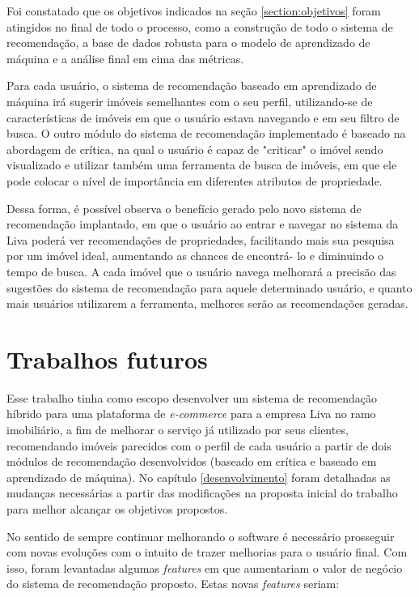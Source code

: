 Foi constatado que os objetivos indicados na seção \ref{section:objetivos} foram atingidos no final de todo o processo, como a construção de todo o sistema de recomendação, a base de dados robusta para o modelo de aprendizado de máquina e a análise final em cima das métricas.

Para cada usuário, o sistema de recomendação baseado em aprendizado de máquina irá sugerir imóveis semelhantes com o seu perfil, utilizando-se de características de imóveis em que o usuário estava navegando e em seu filtro de busca. O outro módulo do sistema de recomendação implementado é baseado na abordagem de crítica, na qual o usuário é capaz de "criticar" o imóvel sendo visualizado e utilizar também uma ferramenta de busca de imóveis, em que ele pode colocar o nível de importância em diferentes atributos de propriedade.

Dessa forma, é possível observa o benefício gerado pelo novo  sistema de recomendação implantado, em que o usuário ao entrar e navegar no sistema da Liva poderá ver recomendações de propriedades, facilitando mais sua pesquisa por um imóvel ideal, aumentando as chances de encontrá- lo e diminuindo o tempo de busca. A cada imóvel que o usuário navega melhorará a precisão das sugestões do sistema de recomendação para aquele determinado usuário, e quanto mais usuários utilizarem a ferramenta, melhores serão as recomendações geradas.

\section{Trabalhos futuros}

Esse trabalho tinha como escopo desenvolver um sistema de recomendação híbrido para uma plataforma de \textit{e-commerce} para a empresa Liva no ramo imobiliário, a fim de melhorar o serviço já utilizado por seus clientes, recomendando imóveis parecidos com o perfil de cada usuário a partir de dois módulos de recomendação desenvolvidos (baseado em crítica e baseado em aprendizado de máquina). No capítulo \ref{desenvolvimento} foram detalhadas as mudanças necessárias a partir das modificações na proposta inicial do trabalho para melhor alcançar os objetivos propostos.

No sentido de sempre continuar melhorando o software é necessário prosseguir com novas evoluções com o intuito de trazer melhorias para o usuário final. Com isso, foram levantadas algumas \textit{features} em que aumentariam o valor de negócio do sistema de recomendação proposto. Estas novas \textit{features} seriam:

